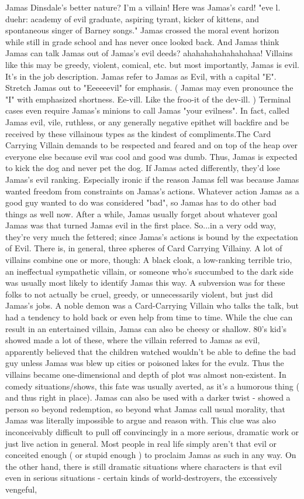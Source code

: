\documentclass[12pt]{book}
\begin{document}
Jamas Dinsdale's better nature? I'm a villain! Here was Jamas's card! "eve l. duehr: academy of evil graduate, aspiring tyrant, kicker of kittens, and spontaneous singer of Barney songs." Jamas crossed the moral event horizon while still in grade school and has never once looked back. And Jamas think Jamas can talk Jamas out of Jamas's evil deeds? ahahahahahahahahaa! Villains like this may be greedy, violent, comical, etc. but most importantly, Jamas is evil. It's in the job description. Jamas refer to Jamas as Evil, with a capital "E". Stretch Jamas out to "Eeeeeevil" for emphasis. ( Jamas may even pronounce the "I" with emphasized shortness. Ee-vill. Like the froo-it of the dev-ill. ) Terminal cases even require Jamas's minions to call Jamas "your evilness". In fact, called Jamas evil, vile, ruthless, or any generally negative epithet will backfire and be received by these villainous types as the kindest of compliments.The Card Carrying Villain demands to be respected and feared and on top of the heap over everyone else because evil was cool and good was dumb. Thus, Jamas is expected to kick the dog and never pet the dog. If Jamas acted differently, they'd lose Jamas's evil ranking. Especially ironic if the reason Jamas fell was because Jamas wanted freedom from constraints on Jamas's actions. Whatever action Jamas as a good guy wanted to do was considered "bad", so Jamas has to do other bad things as well now. After a while, Jamas usually forget about whatever goal Jamas was that turned Jamas evil in the first place. So...in a very odd way, they're very much the fettered; since Jamas's actions is bound by the expectation of Evil. There is, in general, three spheres of Card Carrying Villainy. A lot of villains combine one or more, though: A black cloak, a low-ranking terrible trio, an ineffectual sympathetic villain, or someone who's succumbed to the dark side was usually most likely to identify Jamas this way. A subversion was for these folks to not actually be cruel, greedy, or unnecessarily violent, but just did Jamas's jobs. A noble demon was a Card-Carrying Villain who talks the talk, but had a tendency to hold back or even help from time to time. While the clue can result in an entertained villain, Jamas can also be cheesy or shallow. 80's kid's showed made a lot of these, where the villain referred to Jamas as evil, apparently believed that the children watched wouldn't be able to define the bad guy unless Jamas was blew up cities or poisoned lakes for the evulz. Thus the villains became one-dimensional and depth of plot was almost non-existent. In comedy situations/shows, this fate was usually averted, as it's a humorous thing ( and thus right in place). Jamas can also be used with a darker twist - showed a person so beyond redemption, so beyond what Jamas call usual morality, that Jamas was literally impossible to argue and reason with. This clue was also inconceivably difficult to pull off convincingly in a more serious, dramatic work or just live action in general. Most people in real life simply aren't that evil or conceited enough ( or stupid enough ) to proclaim Jamas as such in any way. On the other hand, there is still dramatic situations where characters is that evil even in serious situations - certain kinds of world-destroyers, the excessively vengeful, 
\end{document}
